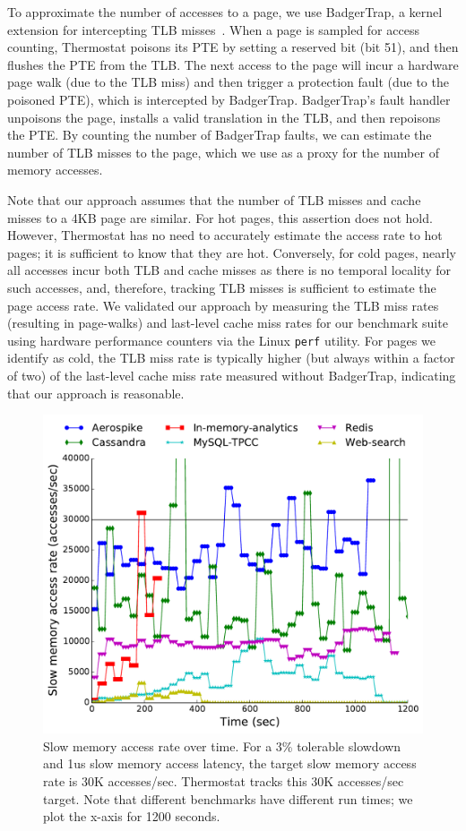 To approximate the number of accesses to a page, we use BadgerTrap, a kernel
extension for intercepting TLB misses~\cite{ref:badgertrap}. When a page is
sampled for access counting, Thermostat poisons its PTE by setting a reserved
bit (bit 51), and then flushes the PTE from the TLB.  The next access to the
page will incur a hardware page walk (due to the TLB miss) and then trigger a
protection fault (due to the poisoned PTE), which is intercepted by BadgerTrap.
BadgerTrap's fault handler unpoisons the page, installs a valid translation in
the TLB, and then repoisons the PTE. By counting the number of BadgerTrap
faults, we can estimate the number of TLB misses to the
page, which we use as a proxy for the number of memory accesses.

Note that our approach assumes that the number of TLB misses and 
cache misses to a 4KB page are similar.  For hot pages, this assertion does not
hold.  However, Thermostat has no need to accurately estimate the access rate
to hot pages; it is sufficient to know that they are hot.  Conversely, for cold pages,
nearly all accesses incur both TLB and cache misses as there is no temporal
locality for such accesses, and, therefore, tracking
TLB misses is sufficient to estimate the page access rate. We validated our 
approach by measuring
the TLB miss rates (resulting in page-walks) and last-level cache miss rates for
our benchmark suite using hardware performance counters via the Linux {\tt perf}
utility. For pages we identify as cold, the TLB miss rate is typically higher (but
always within a factor of two) of the last-level cache miss rate measured
without BadgerTrap, indicating that our approach is reasonable.
\begin{figure}[t]
\centering
\includegraphics[width=0.8\columnwidth]{asplos2017/figures/faults.pdf}
\caption{Slow memory access rate over time. For a 3\% tolerable slowdown and 1us
slow memory access latency, the target slow memory access rate is 30K accesses/sec.
Thermostat tracks this 30K accesses/sec target. Note that different benchmarks
have different run times; we plot the x-axis for 1200 seconds.} 
\label{fig:fault-rate}
\end{figure}


